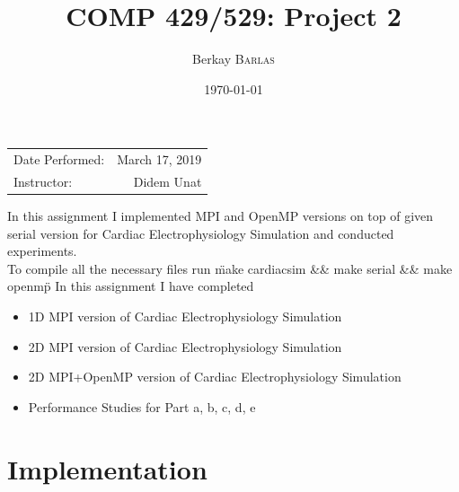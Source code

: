 \documentclass{article}
\title{COMP 429/529: Project 2} %
\author{Berkay \textsc{Barlas}} %
\date{\today} %
\newcommand\tab[1][0.5cm]{\hspace*{#1}}
\begin{document}
\maketitle %

\begin{center}
\begin{tabular}{l r}
Date Performed: & March 17, 2019 \\ %
Instructor: & Didem Unat %
\end{tabular}
\end{center}



\tab In this assignment I implemented MPI and OpenMP versions
on top of given serial version for Cardiac Electrophysiology Simulation and conducted experiments. 
\\ \tab  To compile all the necessary files run \"make cardiacsim \&\& make serial \&\& make openmp\"
\newline
In this assignment I have completed
\begin{itemize}
    \item 1D MPI version of Cardiac Electrophysiology Simulation
    \item 2D MPI version of Cardiac Electrophysiology Simulation
    \item 2D MPI+OpenMP version of Cardiac Electrophysiology Simulation
    \item Performance Studies for Part a, b, c, d, e
\end{itemize}

\section{Implementation}
\end{document}
